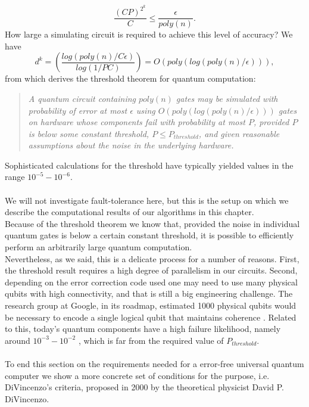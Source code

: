 \begin{equation}
    \frac{(CP)^{2^k}}{C} \leq \frac{\epsilon}{poly(n)}.
\end{equation}
How large a simulating circuit is required to achieve this level of accuracy? We have
\begin{equation}
    d^k = \left( \frac{log(poly(n)/C\epsilon)}{log(1/PC)} \right) = O(poly(log(poly(n)/\epsilon))),
\end{equation}
from which derives the threshold theorem for quantum computation:
\begin{quote}
    \textit{A quantum circuit containing $poly(n)$ gates may be simulated with probability of error at most $\epsilon$ using $O(poly(log(poly(n)/\epsilon)))$ gates on hardware whose components fail with probability at most $P$, provided $P$ is below some constant threshold, $P \leq P_{threshold}$, and given reasonable assumptions about the noise in the underlying hardware.}
\end{quote}
Sophisticated calculations for the threshold have typically yielded values in the range $10^{-5}-10^{-6}$. \\
\\
We will not investigate fault-tolerance here, but this is the setup on which we describe the computational results of our algorithms in this chapter. \\
Because of the threshold theorem we know that, provided the noise in individual quantum gates is below a certain constant threshold, it is possible to efficiently perform an arbitrarily large quantum computation. \\
Nevertheless, as we said, this is a delicate process for a number of reasons. First, the threshold result requires a high degree of parallelism in our circuits. Second, depending on the error correction code used one may need to use many physical qubits with high connectivity, and that is still a big engineering challenge. The research group at Google, in its roadmap, estimated 1000 physical qubits would be necessary to encode a single logical qubit that maintains coherence \cite{Lucero2021May}. Related to this, today's quantum components have a high failure likelihood, namely around $10^{-3}-10^{-2}$ \cite{BibEntry2022Sep}, which is far from the required value of $P_{threshold}$. \\
\\
To end this section on the requirements needed for a error-free universal quantum computer we show a more concrete set of conditions for the purpose, i.e. DiVincenzo's criteria, proposed in 2000 by the theoretical physicist David P. DiVincenzo. \\
